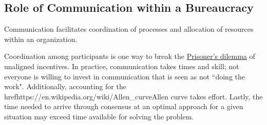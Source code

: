 \subsection{Role of Communication within a Bureaucracy}

Communication facilitates coordination of processes and allocation of resources within an organization. 


Coordination among participants is one way to break the \href{https://en.wikipedia.org/wiki/Prisoner\%27s\_dilemma}{Prisoner's dilemma} of unaligned incentives. In practice, communication takes times and skill; not everyone is willing to invest in communication that is seen as not ``doing the work". Additionally, accounting for the \\href{https://en.wikipedia.org/wiki/Allen\_curve}{Allen curve} takes effort. Lastly, the time needed to arrive through consensus at an optimal approach for a given situation may exceed time available for solving the problem.
 
